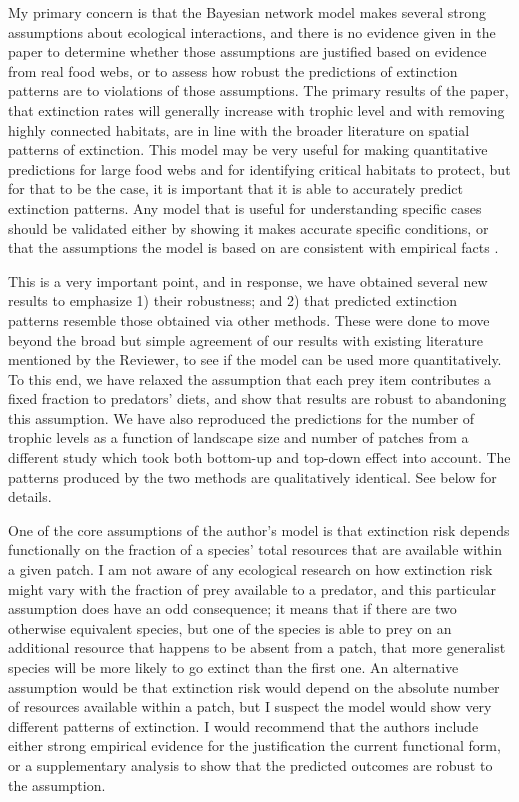 \documentclass[11pt]{article}
\newcommand{\us}{\rm \setlength{\leftskip}{0.3cm} \setlength{\rightskip}{0.3cm}}
\newcommand{\them}{\it \setlength{\leftskip}{0cm} \setlength{\rightskip}{0cm}}
\begin{document}
My primary concern is that the Bayesian network model makes several strong assumptions about ecological interactions, and there is no evidence given in the paper to determine whether those assumptions are justified based on evidence from real food webs, or to assess how robust the predictions of extinction patterns are to violations of those assumptions. The primary results of the paper, that extinction rates will generally increase with trophic level and with removing highly connected habitats, are in line with the broader literature on spatial patterns of extinction. This model may be very useful for making quantitative predictions for large food webs and for identifying critical habitats to protect, but for that to be the case, it is important that it is able to accurately predict extinction patterns. Any model that is useful for understanding specific cases should be validated either by showing it makes accurate specific conditions, or that the assumptions the model is based on are consistent with empirical facts \citep{IvesAgrawal2005}.

\us

This is a very important point, and in response, we have obtained several new results to emphasize 1) their robustness; and 2) that predicted extinction patterns resemble those obtained via other methods. These were done to move beyond the broad but simple agreement of our results with existing literature mentioned by the Reviewer, to see if the model can be used more quantitatively. To this end, we have relaxed the assumption that each prey item contributes a fixed fraction to predators' diets, and show that results are robust to abandoning this assumption. We have also reproduced the predictions for the number of trophic levels as a function of landscape size and number of patches from a different study \citep{Ryser2019} which took both bottom-up and top-down effect into account. The patterns produced by the two methods are qualitatively identical. See below for details.

\them

One of the core assumptions of the author's model is that extinction risk depends functionally on the fraction of a species' total resources that are available within a given patch. I am not aware of any ecological research on how extinction risk might vary with the fraction of prey available to a predator, and this particular assumption does have an odd consequence; it means that if there are two otherwise equivalent species, but one of the species is able to prey on an additional resource that happens to be absent from a patch, that more generalist species will be more likely to go extinct than the first one. An alternative assumption would be that extinction risk would depend on the absolute number of resources available within a patch, but I suspect the model would show very different patterns of extinction. I would recommend that the authors include either strong empirical evidence for the justification the current functional form, or a supplementary analysis to show that the predicted outcomes are robust to the assumption.
\end{document}
